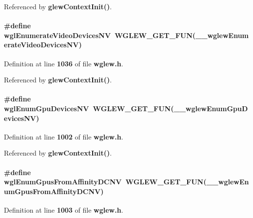 Referenced by {\bf glew\+Context\+Init()}.

\paragraph[{wgl\+Enumerate\+Video\+Devices\+NV}]{\setlength{\rightskip}{0pt plus 5cm}\#define wgl\+Enumerate\+Video\+Devices\+NV~{\bf W\+G\+L\+E\+W\+\_\+\+G\+E\+T\+\_\+\+F\+UN}({\bf \+\_\+\+\_\+wglew\+Enumerate\+Video\+Devices\+NV})}\label{wglew_8h_aaff42c9e306019cf37e3157677bac40c}


Definition at line {\bf 1036} of file {\bf wglew.\+h}.



Referenced by {\bf glew\+Context\+Init()}.

\paragraph[{wgl\+Enum\+Gpu\+Devices\+NV}]{\setlength{\rightskip}{0pt plus 5cm}\#define wgl\+Enum\+Gpu\+Devices\+NV~{\bf W\+G\+L\+E\+W\+\_\+\+G\+E\+T\+\_\+\+F\+UN}({\bf \+\_\+\+\_\+wglew\+Enum\+Gpu\+Devices\+NV})}\label{wglew_8h_ab17c4b701e0f483169b9a00a8f1afb46}


Definition at line {\bf 1002} of file {\bf wglew.\+h}.



Referenced by {\bf glew\+Context\+Init()}.

\paragraph[{wgl\+Enum\+Gpus\+From\+Affinity\+D\+C\+NV}]{\setlength{\rightskip}{0pt plus 5cm}\#define wgl\+Enum\+Gpus\+From\+Affinity\+D\+C\+NV~{\bf W\+G\+L\+E\+W\+\_\+\+G\+E\+T\+\_\+\+F\+UN}({\bf \+\_\+\+\_\+wglew\+Enum\+Gpus\+From\+Affinity\+D\+C\+NV})}\label{wglew_8h_a0a39f83257b99441c0ab8a0d69e7c297}


Definition at line {\bf 1003} of file {\bf wglew.\+h}.



